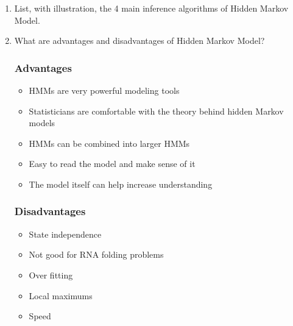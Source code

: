 \documentclass[12pt]{article}
\newenvironment{QandA}{\begin{enumerate}[label=\bfseries\arabic*.]\bfseries}
{\end{enumerate}}
\newenvironment{answered}{\par\normalfont\color{Sepia}}{}
\begin{document}
\begin{QandA}
\begin{answered}
        A Hidden Markov Model (HMM) is composed of the following:
        \begin{itemize}
            \item $\mathcal{X}$ : a finite set of states.
            \item $\mathcal{Z}$ : a finite set of observations.
            \item $T : \mathcal{X} \times \mathcal{X} \rightarrow \mathbb{R}_+$, i.e., transition probabilities.
            \item $M : \mathcal{X} \times \mathcal{Z} \rightarrow \mathbb{R}_+$, i.e., observation probabilities.
            \item $\pi : \mathcal{X} \rightarrow \mathbb{R}_+$, i.e., prior probability distribution on the initial state.
        \end{itemize}
    \end{answered}

    \item List, with illustration, the 4 main inference algorithms of Hidden Markov Model.
    \begin{answered}
    \end{answered}

    \item What are advantages and disadvantages of Hidden Markov Model?
    \begin{answered}
        \subsubsection*{Advantages}
        \begin{itemize}
            \item HMMs are very powerful modeling tools
            \item Statisticians are comfortable with the theory behind hidden Markov models
            \item HMMs can be combined into larger HMMs
            \item Easy to read the model and make sense of it
            \item The model itself can help increase understanding
        \end{itemize}
        \subsubsection*{Disadvantages}
        \begin{itemize}
            \item State independence
            \item Not good for RNA folding problems
            \item Over fitting
            \item Local maximums
            \item Speed
        \end{itemize}

    \end{answered}

\end{QandA}
\end{document}
